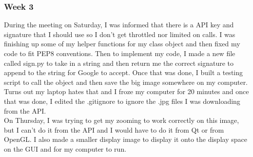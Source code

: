\subsubsection{Week 3}
During the meeting on Saturday, I was informed that there is a API key and signature that I should use so I don't get throttled nor limited on calls.
I was finishing up some of my helper functions for my class object and then fixed my code to fit PEP8 conventions.
Then to implement my code, I made a new file called sign.py to take in a string and then return me the correct signature to append to the string for Google to accept.
Once that was done, I built a testing script to call the object and then save the big image somewhere on my computer.
Turns out my laptop hates that and I froze my computer for 20 minutes and once that was done, I edited the .gitignore to ignore the .jpg files I was downloading from the API.
\\
On Thursday, I was trying to get my zooming to work correctly on this image, but I can't do it from the API and I would have to do it from Qt or from OpenGL.
I also made a smaller display image to display it onto the display space on the GUI and for my computer to run.
